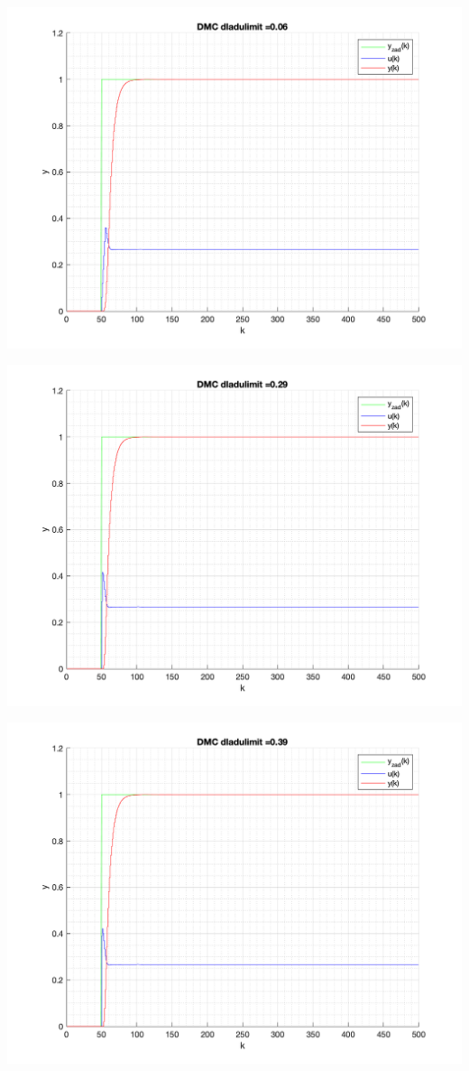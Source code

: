 \documentclass[a4paper, 11pt]{article}
\begin{document}
\begin{enumerate}
 \includegraphics[width=\linewidth]{./ModelsP6_dulimit/P4_DMC_dulimit_0_06_png.png} 
 
 \includegraphics[width=\linewidth]{./ModelsP6_dulimit/P4_DMC_dulimit_0_29_png.png} 
 
 \includegraphics[width=\linewidth]{./ModelsP6_dulimit/P4_DMC_dulimit_0_39_png.png} 
 

\end{enumerate}
\end{document}
